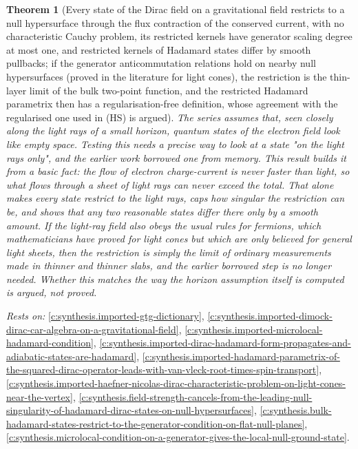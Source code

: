 \documentclass[11pt]{article}
\newtheorem{theorem}{Theorem}[section]
\theoremstyle{definition}
\theoremstyle{plain}
\begin{document}
\begin{theorem}[Every state of the Dirac field on a gravitational field restricts to a null hypersurface through the flux contraction of the conserved current, with no characteristic Cauchy problem, its restricted kernels have generator scaling degree at most one, and restricted kernels of Hadamard states differ by smooth pullbacks; if the generator anticommutation relations hold on nearby null hypersurfaces (proved in the literature for light cones), the restriction is the thin-layer limit of the bulk two-point function, and the restricted Hadamard parametrix then has a regularisation-free definition, whose agreement with the regularised one used in (HS) is argued]\label{c:synthesis.dirac-states-restrict-to-null-hypersurfaces-through-the-flux-contraction-and-are-thin-layer-limits-under-the-generator-car}
The series assumes that, seen closely along the light rays of a small horizon, quantum states of the electron field look like empty space. Testing this needs a precise way to look at a state "on the light rays only", and the earlier work borrowed one from memory. This result builds it from a basic fact: the flow of electron charge-current is never faster than light, so what flows through a sheet of light rays can never exceed the total. That alone makes every state restrict to the light rays, caps how singular the restriction can be, and shows that any two reasonable states differ there only by a smooth amount. If the light-ray field also obeys the usual rules for fermions, which mathematicians have proved for light cones but which are only believed for general light sheets, then the restriction is simply the limit of ordinary measurements made in thinner and thinner slabs, and the earlier borrowed step is no longer needed. Whether this matches the way the horizon assumption itself is computed is argued, not proved.
\end{theorem}
\noindent\emph{Rests on:} \ref{c:synthesis.imported-gtg-dictionary}, \ref{c:synthesis.imported-dimock-dirac-car-algebra-on-a-gravitational-field}, \ref{c:synthesis.imported-microlocal-hadamard-condition}, \ref{c:synthesis.imported-dirac-hadamard-form-propagates-and-adiabatic-states-are-hadamard}, \ref{c:synthesis.imported-hadamard-parametrix-of-the-squared-dirac-operator-leads-with-van-vleck-root-times-spin-transport}, \ref{c:synthesis.imported-haefner-nicolas-dirac-characteristic-problem-on-light-cones-near-the-vertex}, \ref{c:synthesis.field-strength-cancels-from-the-leading-null-singularity-of-hadamard-dirac-states-on-null-hypersurfaces}, \ref{c:synthesis.bulk-hadamard-states-restrict-to-the-generator-condition-on-flat-null-planes}, \ref{c:synthesis.microlocal-condition-on-a-generator-gives-the-local-null-ground-state}.
\end{document}
